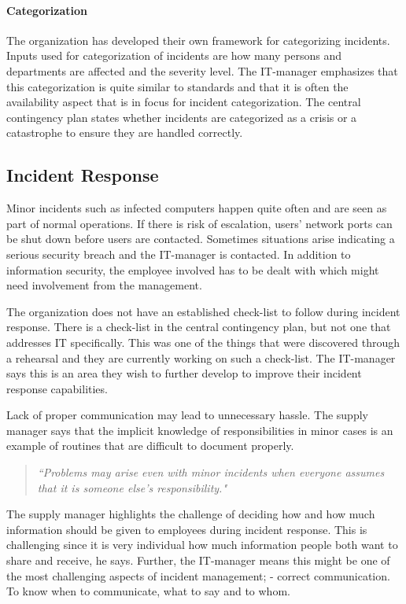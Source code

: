 \paragraph{Categorization}
The organization has developed their own framework for categorizing incidents. Inputs used for categorization of incidents are how many persons and departments are affected and the severity level. The IT-manager emphasizes that this categorization is quite similar to standards and that it is often the availability aspect that is in focus for incident categorization. The central contingency plan states whether incidents are categorized as a crisis or a catastrophe to ensure they are handled correctly.

\subsection{Incident Response}
Minor incidents such as infected computers happen quite often and are seen as part of normal operations. If there is risk of escalation, users' network ports can be shut down before users are contacted. Sometimes situations arise indicating a serious security breach and the IT-manager is contacted. In addition to information security, the employee involved has to be dealt with which might need involvement from the management.

The organization does not have an established check-list to follow during incident response. There is a check-list in the central contingency plan, but not one that addresses IT specifically. This was one of the things that were discovered through a rehearsal and they are currently working on such a check-list. The IT-manager says this is an area they wish to further develop to improve their incident response capabilities. 

Lack of proper communication may lead to unnecessary hassle. The supply manager says that the implicit knowledge of responsibilities in minor cases is an example of routines that are difficult to document properly.
\begin{quote}
\textit{``Problems may arise even with minor incidents when everyone assumes that it is someone else's responsibility."}
\end{quote}

The supply manager highlights the challenge of deciding how and how much information should be given to employees during incident response. This is challenging since it is very individual how much information people both want to share and receive, he says. Further, the IT-manager means this might be one of the most challenging aspects of incident management; - correct communication. To know when to communicate, what to say and to whom. 

